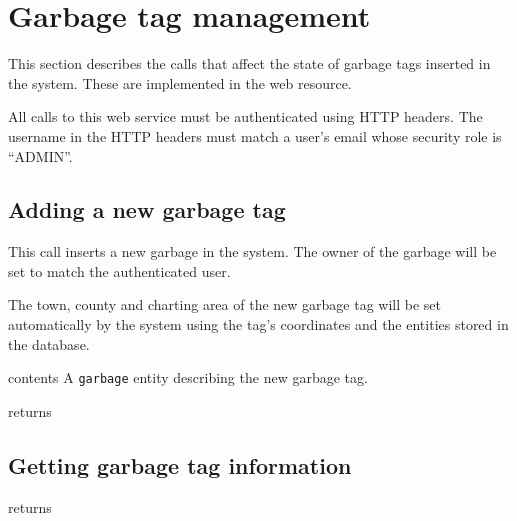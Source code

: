 \section{Garbage tag management}

This section describes the calls that affect the state of garbage tags inserted
in the system. These are implemented in the
 web
resource.

All calls to this web service must be authenticated using HTTP headers. The
username in the HTTP headers must match a user's email whose security role is
``ADMIN''.


\subsection{Adding a new garbage tag}

This call inserts a new garbage in the system. The owner of the garbage will be
set to match the authenticated user.

The town, county and charting area of the new garbage tag will be set
automatically by the system using the tag's coordinates and the entities stored
in the database.

\begin{apidata}{contents}
  A \texttt{garbage} entity describing the new garbage tag.
\end{apidata}
\begin{apidata}{returns}
  \begin{datalist}
  \end{datalist}
\end{apidata}


\subsection{Getting garbage tag information}

\begin{apidata}{returns}
  \begin{datalist}
  \end{datalist}
\end{apidata}


% 
% 



